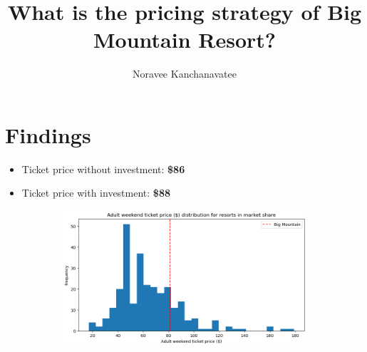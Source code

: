 \documentclass[14pt,a4paper]{extarticle}
\title{What is the pricing strategy of Big Mountain Resort?}
\author{Noravee Kanchanavatee}
\begin{document}
	\maketitle
	\section*{Findings}
	\begin{itemize}
		\item Ticket price without investment: \textbf{\$86}
		\item Ticket price with investment: \textbf{\$88}
	\end{itemize}
	\begin{figure}
		\centering
		\begin{subfigure}{0.99\textwidth}
			\includegraphics[width=\textwidth]{Price}
			\caption{}
		\end{subfigure}
		

\end{figure}
\end{document}
